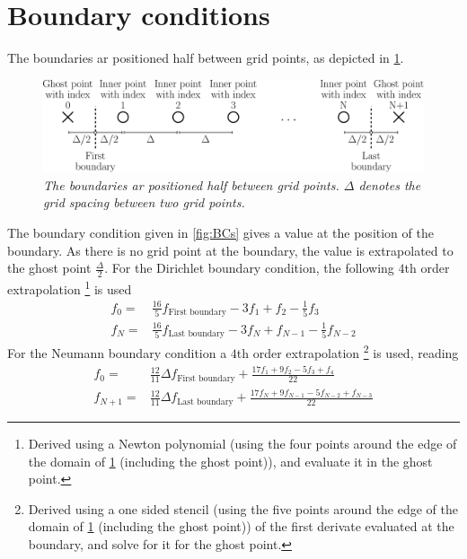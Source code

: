 \section{Boundary conditions}
%
The boundaries ar positioned half between grid points, as depicted in \cref{fig:flatBC}.
%
\begin{figure}[htb]
    \centering
    \includegraphics[width=1.0\textwidth]{fig/flatGrid}
    \caption{\textit{
            The boundaries ar positioned half between grid points.
            $\Delta$ denotes the grid spacing between two grid points.
        }}
    \label{fig:flatBC}
\end{figure}
%
The boundary condition given in \cref{fig:BCs} gives a value at the position of the boundary.
As there is no grid point at the boundary, the value is extrapolated to the ghost point $\frac{\Delta}{2}$.
For the Dirichlet boundary condition, the following $4$th order extrapolation %
%
\footnote{
Derived using a Newton polynomial (using the four points around the edge of the domain of \cref{fig:flatBC} (including the ghost point)), and evaluate it in the ghost point.
}%
is used
%
\begin{align*}
      f_{0} =& \frac{16}{5}f_{\text{First boundary}}
              - 3          f_1
              +            f_2
              - \frac{1}{5}f_3
    \\
      f_{N} =& \frac{16}{5}f_{\text{Last boundary}}
              - 3          f_{N}
              +            f_{N-1}
              - \frac{1}{5}f_{N-2}
\end{align*}
%
For the Neumann boundary condition a $4$th order extrapolation %
%
\footnote{
Derived using a one sided stencil (using the five points around the edge of the domain of \cref{fig:flatBC} (including the ghost point)) of the first derivate evaluated at the boundary, and solve for it for the ghost point.
}%
%
is used, reading
%
\begin{align*}
      f_0 =& \frac{12}{11}\Delta f_{\text{First boundary}}
                +
                \frac{
                  17f_1
                +  9f_2
                -  5f_3
                +   f_4
               }{22}
    \\
      f_{N+1} =& \frac{12}{11}\Delta f_{\text{Last boundary}}
                +
                \frac{
                  17f_{N}
                +  9f_{N-1}
                -  5f_{N-2}
                +   f_{N-3}
               }{22}
\end{align*}

